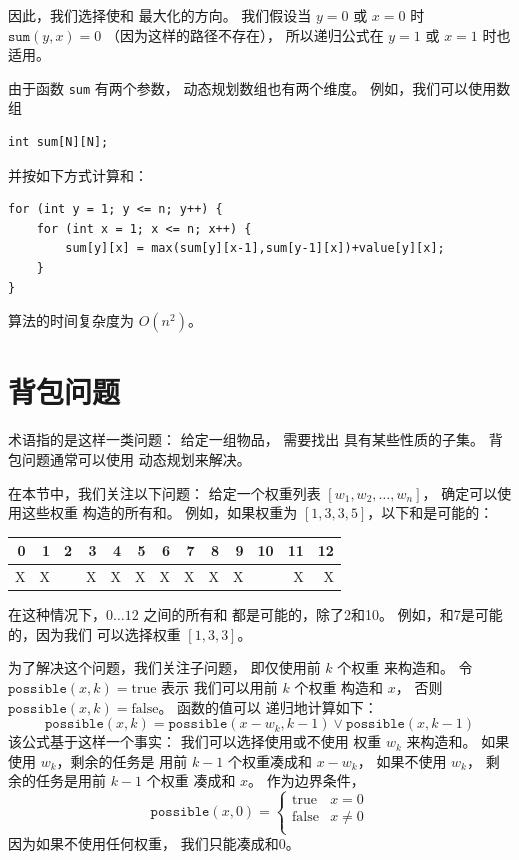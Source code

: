 因此，我们选择使和
最大化的方向。
我们假设当 $y=0$ 或 $x=0$ 时
$\texttt{sum}(y,x)=0$
（因为这样的路径不存在），
所以递归公式在 $y=1$ 或 $x=1$ 时也适用。

由于函数 \texttt{sum} 有两个参数，
动态规划数组也有两个维度。
例如，我们可以使用数组
\begin{lstlisting}
int sum[N][N];
\end{lstlisting}
并按如下方式计算和：
\begin{lstlisting}
for (int y = 1; y <= n; y++) {
    for (int x = 1; x <= n; x++) {
        sum[y][x] = max(sum[y][x-1],sum[y-1][x])+value[y][x];
    }
}
\end{lstlisting}
算法的时间复杂度为 $O(n^2)$。

\section{背包问题}


术语指的是这样一类问题：
给定一组物品，
需要找出
具有某些性质的子集。
背包问题通常可以使用
动态规划来解决。

在本节中，我们关注以下问题：
给定一个权重列表
$[w_1,w_2,\ldots,w_n]$，
确定可以使用这些权重
构造的所有和。
例如，如果权重为
$[1,3,3,5]$，以下和是可能的：

\begin{center}
\begin{tabular}{rrrrrrrrrrrrr}
 0 & 1 & 2 & 3 & 4 & 5 & 6 & 7 & 8 & 9 & 10 & 11 & 12 \\
\hline
 X & X & & X & X & X & X & X & X & X & & X & X \\
\end{tabular}
\end{center}

在这种情况下，$0 \ldots 12$ 之间的所有和
都是可能的，除了2和10。
例如，和7是可能的，因为我们
可以选择权重 $[1,3,3]$。

为了解决这个问题，我们关注子问题，
即仅使用前 $k$ 个权重
来构造和。
令 $\texttt{possible}(x,k)=\textrm{true}$ 表示
我们可以用前 $k$ 个权重
构造和 $x$，
否则 $\texttt{possible}(x,k)=\textrm{false}$。
函数的值可以
递归地计算如下：
\[ \texttt{possible}(x,k) = \texttt{possible}(x-w_k,k-1) \lor \texttt{possible}(x,k-1) \]
该公式基于这样一个事实：
我们可以选择使用或不使用
权重 $w_k$ 来构造和。
如果使用 $w_k$，剩余的任务是
用前 $k-1$ 个权重凑成和 $x-w_k$，
如果不使用 $w_k$，
剩余的任务是用前 $k-1$ 个权重
凑成和 $x$。
作为边界条件，
\begin{equation*}
    \texttt{possible}(x,0) = \begin{cases}
               \textrm{true}    & x = 0\\
               \textrm{false}   & x \neq 0 \\
           \end{cases}
\end{equation*}
因为如果不使用任何权重，
我们只能凑成和0。

